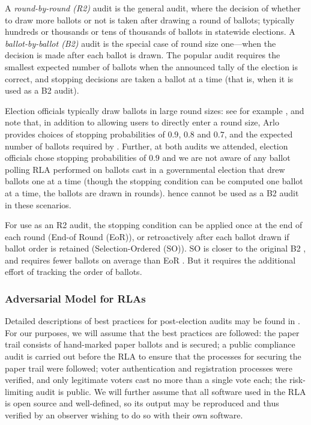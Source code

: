 A {\em round-by-round (R2)} audit is the general audit, where the decision of whether to draw more ballots or not is taken after drawing a round of ballots; typically hundreds or thousands or tens of thousands of ballots in statewide elections. A {\em ballot-by-ballot (B2)} audit is the special case of round size one---when the decision is made after each ballot is drawn. The popular \BRAVO audit requires the smallest expected number of ballots when the announced tally of the election is correct, and stopping decisions are taken a ballot at a time (that is, when it is used as a B2 audit). 

Election officials typically draw ballots in large round sizes:  see for example \cite{va-2022,RI-report}, and note that, in addition to allowing users to directly enter a round size, Arlo provides choices of stopping probabilities of $0.9$, $0.8$ and $0.7$, and the expected number of ballots required by \BRAVO. Further, at both audits we attended, election officials chose stopping probabilities of $0.9$ and we are not aware of any ballot polling RLA performed on ballots cast in a governmental election that drew ballots one at a time (though the stopping condition can be computed one ballot at a time, the ballots are drawn in rounds). \BRAVO hence cannot be used as a B2 audit in these scenarios. 

For use as an R2 audit, the \BRAVO stopping condition can be applied once at the end of each round (End-of Round (EoR)), or retroactively after each ballot drawn if ballot order is retained (Selection-Ordered (SO)). SO \BRAVO is closer to the original B2 \BRAVO, and requires fewer ballots on average than EoR \BRAVO. But it requires the additional effort of tracking the order of ballots. 

\subsubsection{Adversarial Model for RLAs}
Detailed descriptions of best practices for post-election audits may be found in \cite{best-practices,why-and-how}. For our purposes, we will assume that the best practices are followed: the paper trail consists of hand-marked paper ballots and is secured; a public compliance audit is carried out before the RLA to ensure that the processes for securing the paper trail were followed; voter authentication and registration processes were verified, and only legitimate voters cast no more than a single vote each; the risk-limiting audit is public. We will further assume that all software used in the RLA is open source and well-defined, so its output may be reproduced and thus verified by an observer wishing to do so with their own software. 

